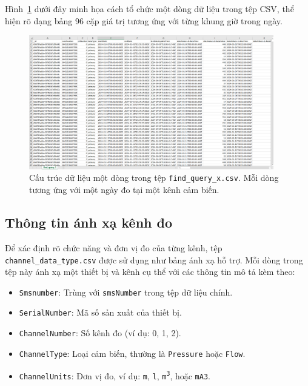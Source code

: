 \vspace{1em}
Hình~\ref{fig:sample_data_structure} dưới đây minh họa cách tổ chức một dòng dữ liệu trong tệp CSV, thể hiện rõ dạng bảng 96 cặp giá trị tương ứng với từng khung giờ trong ngày.

\begin{figure}[htbp]
    \centering
    \includegraphics[width=0.95\textwidth]{image/section6_1/sample_data_structure.png}
    \caption{Cấu trúc dữ liệu một dòng trong tệp \texttt{find\_query\_x.csv}. Mỗi dòng tương ứng với một ngày đo tại một kênh cảm biến.}
    \label{fig:sample_data_structure}
\end{figure}

\subsection{Thông tin ánh xạ kênh đo}

Để xác định rõ chức năng và đơn vị đo của từng kênh, tệp \texttt{channel\_data\_type.csv} được sử dụng như bảng ánh xạ hỗ trợ. Mỗi dòng trong tệp này ánh xạ một thiết bị và kênh cụ thể với các thông tin mô tả kèm theo:

\begin{itemize}
    \item \texttt{Smsnumber}: Trùng với \texttt{smsNumber} trong tệp dữ liệu chính.
    \item \texttt{SerialNumber}: Mã số sản xuất của thiết bị.
    \item \texttt{ChannelNumber}: Số kênh đo (ví dụ: 0, 1, 2).
    \item \texttt{ChannelType}: Loại cảm biến, thường là \texttt{Pressure} hoặc \texttt{Flow}.
    \item \texttt{ChannelUnits}: Đơn vị đo, ví dụ: \texttt{m}, \texttt{l}, \texttt{m\textsuperscript{3}}, hoặc \texttt{mA3}.
\end{itemize}

